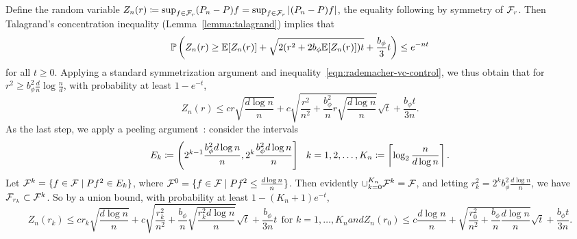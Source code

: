 \documentclass[11pt]{article}
\newcommand{\radphi}{b_{\phi}}
\begin{document}
Define the random variable $Z_n(r) \coloneqq
\sup_{f \in \mathcal{F}_r} (P_n - P) f = \sup_{f \in \mathcal{F}_r} |(P_n - P) f|$, the
equality following by symmetry of $\mathcal{F}_r$. Then
Talagrand's concentration inequality (Lemma~\ref{lemma:talagrand}) implies
that
\begin{equation*}
  \P\left(Z_n(r) \ge \E[Z_n(r)]
  + \sqrt{2 (r^2 + 2 \radphi \E[Z_n(r)]) t}
  + \frac{\radphi}{3} t \right) \le e^{-nt}
\end{equation*}
for all $t \ge 0$.  Applying a standard symmetrization argument and
inequality~\eqref{eqn:rademacher-vc-control},
we thus obtain that for $r^2 \ge \radphi^2 \frac{d}{n} \log \frac{n}{d}$,
with probability at least $1 - e^{-t}$,
\begin{equation*}
  Z_n(r) \le c r \sqrt{\frac{d \log n}{n}}
  + c \sqrt{\frac{r^2}{n^2} + \frac{\radphi^2}{n}
    r \sqrt{\frac{d \log n}{n}}} \sqrt{t}
  + \frac{\radphi t}{3n}.
\end{equation*}
As the last step, we apply a peeling
argument~\cite{Wainwright19, vandeGeer00}: consider the intervals
\begin{equation*}
  E_k \defeq \openleft{2^{k-1}\frac{\radphi^2 d \log n}{n}}{
    2^k \frac{\radphi^2 d \log n}{n}}
  ~~
  k = 1, 2, \ldots, K_n \defeq \ceil{\log_2 \frac{n}{d \log n}}.
\end{equation*}
Let $\mathcal{F}^k = \{f \in \mathcal{F} \mid  Pf^2 \in E_k\}$,
where $\mathcal{F}^0 = \{f \in \mathcal{F} \mid Pf^2 \le \frac{d \log n}{n}\}$. Then
evidently $\cup_{k = 0}^{K_n} \mathcal{F}^k = \mathcal{F}$, and letting
$r_k^2 = 2^k \radphi^2 \frac{d \log n}{n}$, we have
$\mathcal{F}_{r_k} \subset \mathcal{F}^k$. So by a union bound,
with probability at least $1 - (K_n + 1)e^{-t}$,
\begin{subequations}
  \label{eqn:peeling-inequalities}
  \begin{equation}
    Z_n(r_k) \le c r_k \sqrt{\frac{d \log n}{n}} + c
    \sqrt{\frac{r_k^2}{n^2} + \frac{\radphi}{n}
      \sqrt{\frac{r_k^2 d \log n}{n}}} \sqrt{t} + \frac{\radphi}{3n} t
    ~~ \mbox{for~} k = 1, \ldots, K_n
  \end{equation}
  and
  \begin{equation}
    Z_n(r_0) \le c \frac{d \log n}{n}
    + \sqrt{\frac{r_0^2}{n^2} + \frac{\radphi}{n}
      \frac{d \log n}{n}} \sqrt{t} + \frac{\radphi t}{3n}.
  \end{equation}
\end{subequations}
\end{document}
